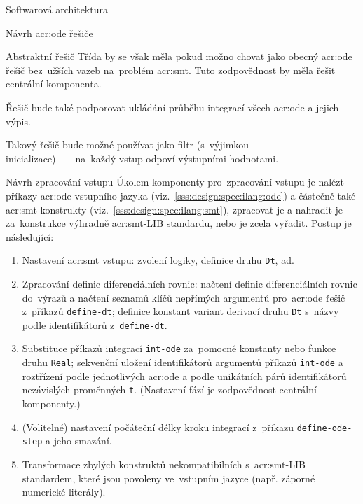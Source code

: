 \documentclass[thesis=M,czech]{FITthesis}[2012/06/26]
\newcommand{\acrlabel}[1]{acr:#1}
\newcommand{\acr}[1]{\acrshort{\acrlabel{#1}}}
\newcommand{\id}[1]{\texttt{#1}}
\newcommand{\rf}[1]{\ref{#1}}
\begin{document}
\begin{section}{Softwarová architektura}
\begin{subsection}{Návrh \acr{ode} řešiče}
\begin{subsubsection}{Abstraktní řešič}
Třída by se však měla pokud možno chovat
jako obecný \acr{ode} řešič
bez~užších vazeb na~problém \acr{smt}.
Tuto zodpovědnost by měla řešit centrální komponenta.

Řešič bude také podporovat ukládání průběhu
integrací všech \acr{ode} a jejich výpis.

Takový řešič bude možné používat jako filtr
(s~výjimkou inicializace)~---~na~každý vstup
odpoví výstupními hodnotami.
\end{subsubsection} %


\end{subsection} %


\begin{subsection}{Návrh zpracování vstupu}\label{ss:design:arch:parse}
Úkolem komponenty pro~zpracování vstupu
je nalézt příkazy \acr{ode} vstupního jazyka
(viz.~\rf{sss:design:spec:ilang:ode})
a částečně také \acr{smt} konstrukty
(viz.~\rf{sss:design:spec:ilang:smt}),
zpracovat je a nahradit je za~konstrukce
výhradně \acr{smt}-LIB standardu,
nebo je zcela vyřadit.
Postup je následující:
\begin{enumerate}
\item Nastavení \acr{smt} vstupu: zvolení logiky,
   definice druhu \id{Dt}, ad.
\item Zpracování definic diferenciálních rovnic:
   načtení definic diferenciálních rovnic do~výrazů
   a načtení seznamů klíčů nepřímých argumentů pro~\acr{ode} řešič
   z~příkazů \id{define\--dt};
   definice konstant variant derivací druhu \id{Dt}
   s~názvy podle identifikátorů z~\id{define\--dt}.
\item Substituce příkazů integrací \id{int\--ode}
   za~pomocné konstanty nebo funkce druhu \id{Real};
   sekvenční uložení identifikátorů argumentů příkazů \id{int\--ode}
   a roztřízení podle jednotlivých \acr{ode}
   a podle unikátních párů identifikátorů nezávislých proměnných \id{t}.
   (Nastavení fází je zodpovědnost centrální komponenty.)
\item (Volitelné) nastavení počáteční délky kroku integrací
   z~příkazu \id{define\--ode\--step} a jeho smazání.
\item Transformace zbylých konstruktů nekompatibilních
   s~\acr{smt}-LIB standardem, které jsou povoleny ve~vstupním jazyce
   (např. záporné numerické literály).
\end{enumerate}


\end{subsection}
\end{section}
\end{document}
